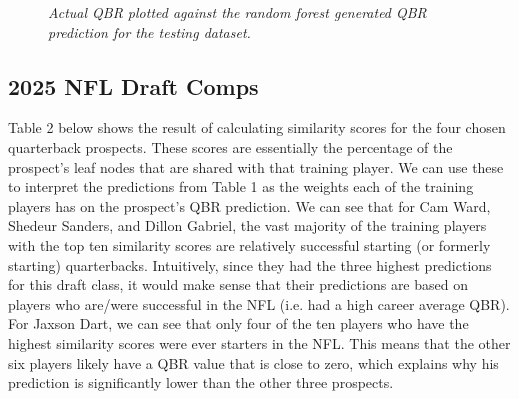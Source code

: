 \documentclass{article}
\begin{document}
\begin{figure}[H]
    \centering
    \caption{\textit{Actual QBR plotted against the random forest generated QBR prediction for the testing dataset.}}
    \label{fig:predicted-vs-actuals}
\end{figure}



\subsection{2025 NFL Draft Comps}

Table 2 below shows the result of calculating similarity scores for the four chosen quarterback prospects. These scores are essentially the percentage of the prospect's leaf nodes that are shared with that training player. We can use these to interpret the predictions from Table 1 as the weights each of the training players has on the prospect's QBR prediction. We can see that for Cam Ward, Shedeur Sanders, and Dillon Gabriel, the vast majority of the training players with the top ten similarity scores are relatively successful starting (or formerly starting) quarterbacks. Intuitively, since they had the three highest predictions for this draft class, it would make sense that their predictions are based on players who are/were successful in the NFL (i.e. had a high career average QBR). For Jaxson Dart, we can see that only four of the ten players who have the highest similarity scores were ever starters in the NFL. This means that the other six players likely have a QBR value that is close to zero, which explains why his prediction is significantly lower than the other three prospects.
\end{document}
